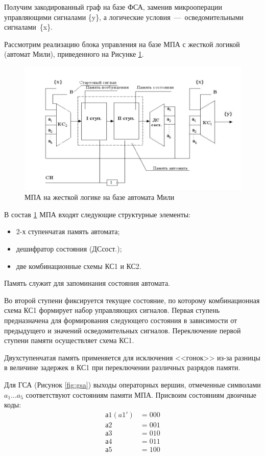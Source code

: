 \documentclass[a4paper,14pt]{extarticle}
\begin{document}
	Получим закодированный граф на базе ФСА, заменив микрооперации
	управляющими сигналами \{y\}, а логические условия~---~осведомительными сигналами~\{x\}.
	
	Рассмотрим реализацию блока управления на базе МПА с жесткой логикой (автомат Мили), приведенного на Рисунке \ref{fig:mili}.
	
	\begin{figure}[h!]
		\centering
		\includegraphics[width=0.8\linewidth]{images/mili}
		\caption{МПА на жесткой логике на базе автомата Мили }
		\label{fig:mili}
	\end{figure}
В состав \ref{fig:mili} МПА входят следующие структурные элементы: 
\begin{itemize}
	\item 2-х ступенчатая память автомата;
	\item дешифратор состояния (ДСсост.);
	\item две комбинационные схемы КС1 и КС2. 
\end{itemize}
Память служит для запоминания состояния автомата.

Во второй ступени фиксируется текущее состояние, по которому комбинационная
схема КС1 формирует набор управляющих сигналов. Первая ступень предназначена
для формирования следующего состояния в зависимости от предыдущего и
значений осведомительных сигналов. Переключение первой ступени памяти осуществляет схема КС1.

Двухступенчатая память применяется для исключения
<<гонок>> из-за разницы в величине задержек в КС1 при переключении различных разрядов памяти.

Для ГСА (Рисунок \ref{fig:gsa}) выходы операторных вершин, отмеченные символами $a_1 ... a_5$ соответствуют состояниям памяти МПА. Присвоим состояниям двоичные коды:
\begin{align*}
 	а1(a1') &= 000 \\
 	а2 &= 001 \\ 
 	а3 &= 010 \\
 	 а4 &= 011 \\
 	 а5 &= 100
\end{align*}
\end{document}
